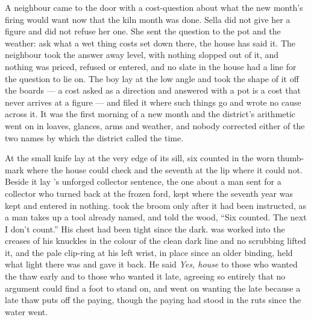 A neighbour came to the door with a cost-question about what the new month's firing would want now that the kiln month was done. Sella did not give her a figure and did not refuse her one. She sent the question to the pot and the weather: ask what a wet thing costs set down there, the house has said it. The neighbour took the answer away level, with nothing slopped out of it, and nothing was priced, refused or entered, and no slate in the house had a line for the question to lie on. The boy lay at the low angle and took the shape of it off the boards --- a cost asked as a direction and answered with a pot is a cost that never arrives at a figure --- and filed it where such things go and wrote no cause across it. It was the first morning of a new month and the district's arithmetic went on in loaves, glances, arms and weather, and nobody corrected either of the two names by which the district called the time.

\scenebreak

At  the small knife lay at the very edge of its sill, six counted in the worn thumb-mark where the house could check and the seventh at the lip where it could not. Beside it lay 's unforged collector sentence, the one about a man sent for a collector who turned back at the frozen ford, kept where the seventh year was kept and entered in nothing.  took the broom only after it had been instructed, as a man takes up a tool already named, and told the wood, “Six counted. The next I don't count.” His chest had been tight since the dark.  was worked into the creases of his knuckles in the colour of the clean dark line and no scrubbing lifted it, and the pale clip-ring at his left wrist, in place since an older binding, held what light there was and gave it back. He said \emph{Yes, house} to those who wanted the thaw early and to those who wanted it late, agreeing so entirely that no argument could find a foot to stand on, and went on wanting the late because a late thaw puts off the paying, though the paying had stood in the ruts since the water went.


